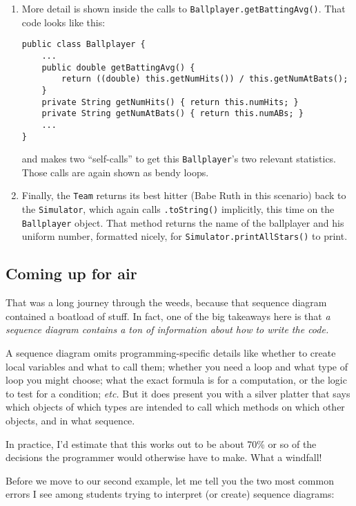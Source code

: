 \begin{enumerate}
\item More detail is shown inside the calls to
\texttt{Ballplayer.getBattingAvg()}. That code looks like this:

\begin{Verbatim}[fontsize=\scriptsize,samepage=true,frame=single]
public class Ballplayer {
    ...
    public double getBattingAvg() {
        return ((double) this.getNumHits()) / this.getNumAtBats();
    }
    private String getNumHits() { return this.numHits; }
    private String getNumAtBats() { return this.numABs; }
    ...
}
\end{Verbatim}

and makes two ``self-calls'' to get this \texttt{Ballplayer}'s two relevant
statistics. Those calls are again shown as bendy loops.

\item Finally, the \texttt{Team} returns its best hitter (Babe Ruth in this
scenario) back to the \texttt{Simulator}, which again calls
\texttt{.toString()} implicitly, this time on the \texttt{Ballplayer} object.
That method returns the name of the ballplayer and his uniform number,
formatted nicely, for \texttt{Simulator.printAllStars()} to print.

\end{enumerate}

\subsection{Coming up for air}

That was a long journey through the weeds, because that sequence diagram
contained a boatload of stuff. In fact, one of the big takeaways here is that
\textit{a sequence diagram contains a ton of information about how to write
the code.}

A sequence diagram omits programming-specific details like whether to create
local variables and what to call them; whether you need a loop and what type
of loop you might choose; what the exact formula is for a computation, or the
logic to test for a condition; \textit{etc.} But it does present you with a
silver platter that says which objects of which types are intended to call
which methods on which other objects, and in what sequence.

In practice, I'd estimate that this works out to be about 70\% or so of the
decisions the programmer would otherwise have to make. What a windfall!

Before we move to our second example, let me tell you the two most common
errors I see among students trying to interpret (or create) sequence diagrams:

